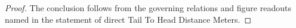 \begin{proof}
  The conclusion follows from the governing relations and figure readouts named in the statement of direct Tail To Head Distance Meters.
\end{proof}
